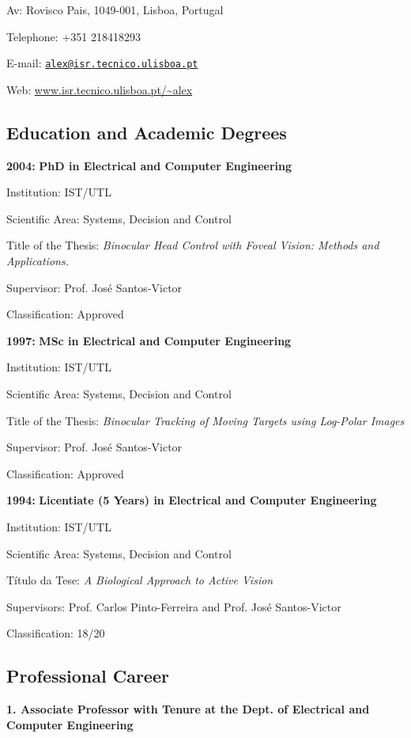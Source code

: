 \documentclass[
]{article}
\begin{document}
Av: Rovisco Pais, 1049-001, Lisboa, Portugal

Telephone: +351 218418293

E-mail:
\href{mailto:alex@isr.tecnico.ulisboa.pt}{\nolinkurl{alex@isr.tecnico.ulisboa.pt}}

Web:
\href{http://www.isr.tecnico.ulisboa.pt/~alex}{www.isr.tecnico.ulisboa.pt/\textasciitilde alex}

\subsection{Education and Academic
Degrees}\label{education-and-academic-degrees}

\textbf{2004:} \textbf{PhD in Electrical and Computer Engineering}

Institution: IST/UTL

Scientific Area: Systems, Decision and Control

Title of the Thesis: \emph{Binocular Head Control with Foveal Vision:
Methods and Applications.}

Supervisor: Prof. José Santos-Victor

Classification: Approved

\textbf{1997:} \textbf{MSc in Electrical and Computer Engineering}

Institution: IST/UTL

Scientific Area: Systems, Decision and Control

Title of the Thesis: \emph{Binocular Tracking of Moving Targets using
Log-Polar Images}

Supervisor: Prof. José Santos-Victor

Classification: Approved

\textbf{1994:} \textbf{Licentiate (5 Years) in Electrical and Computer
Engineering}

Institution: IST/UTL

Scientific Area: Systems, Decision and Control

Título da Tese: \emph{A Biological Approach to Active Vision}

Supervisors: Prof. Carlos Pinto-Ferreira and Prof. José Santos-Victor

Classification: 18/20

\subsection{Professional Career}\label{professional-career}

\textbf{1. Associate Professor with Tenure at the Dept. of Electrical
and Computer Engineering}
\end{document}
